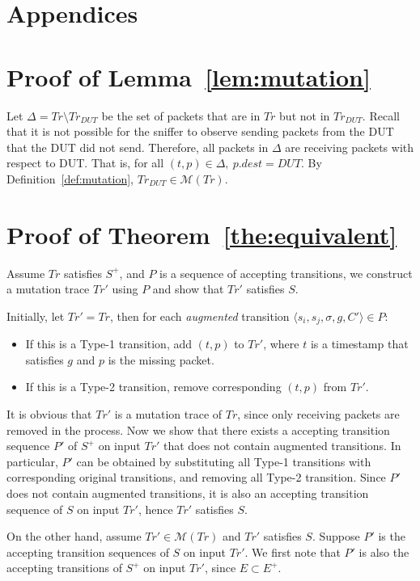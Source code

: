 \section*{Appendices}
\appendix

\section{Proof of Lemma~\ref{lem:mutation}}
\label{app:lemma1}
Let $\Delta = Tr \setminus Tr_{DUT}$ be the set of packets that are in $Tr$
but not in $Tr_{DUT}$. Recall that it is not possible for the sniffer to
observe sending packets from the DUT that the DUT did not send. Therefore,
all packets in $\Delta$ are receiving packets with respect to DUT. That is, for
all $(t, p) \in \Delta,\ p.dest = DUT$. By Definition~\ref{def:mutation},
$Tr_{DUT} \in \mathcal{M}(Tr)$.



\section{Proof of Theorem~\ref{the:equivalent}}
\label{app:theorem1}
Assume $Tr$ satisfies $S^+$, and $P$ is a sequence of accepting transitions,
we construct a mutation trace $Tr'$ using $P$ and show that $Tr'$ satisfies
$S$.

Initially, let $Tr'=Tr$, then for each \textit{augmented} transition $\langle s_i,
s_j, \sigma, g, C'\rangle \in P$:
\begin{itemize}
  \item If this is a Type-1 transition, add $(t, p)$ to $Tr'$, where $t$ is a
    timestamp that satisfies $g$ and $p$ is the missing packet.
  \item If this is a Type-2 transition, remove corresponding $(t, p)$ from
    $Tr'$.
\end{itemize}
It is obvious that $Tr'$ is a mutation trace of $Tr$, since only receiving
packets are removed in the process.
%
Now we show that there exists a accepting
transition sequence $P'$ of $S^+$ on input $Tr'$ that does not contain
augmented transitions.
%
In particular, $P'$ can be obtained by substituting all
Type-1 transitions with corresponding original transitions, and removing all
Type-2 transition.
%
Since $P'$ does not contain augmented transitions, it is also an accepting
transition sequence of $S$ on input $Tr'$, hence $Tr'$ satisfies $S$.

On the other hand, assume $Tr' \in \mathcal{M}(Tr)$ and $Tr'$ satisfies $S$.
Suppose $P'$ is the accepting transition sequences of $S$ on input $Tr'$.
%
We first note that $P'$ is also the accepting transitions of $S^+$ on input
$Tr'$, since $E \subset E^+$.

